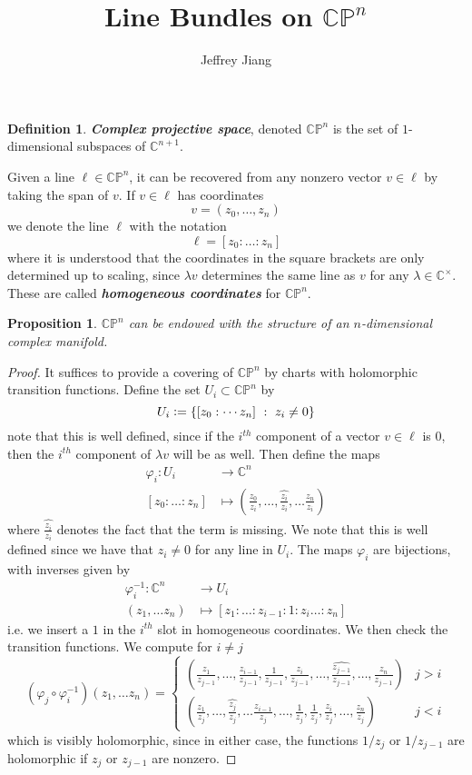 \documentclass[psamsfonts, 12pt]{amsart}
\newtheorem{prop}[thm]{Proposition}
\theoremstyle{definition}
\newtheorem{defn}[thm]{Definition}
\theoremstyle{remark}
\newcommand{\ib}[1]{\textbf{\textit{#1}}}
\newcommand{\C}{\mathbb{C}}
\newcommand{\CP}{\mathbb{CP}}
\newcommand{\inv}{^{-1}}
\newcommand{\set}[1]{\left\lbrace #1 \right\rbrace}
\newcommand{\defeq}{\vcentcolon=}
\begin{document}
%
\author{Jeffrey Jiang}
%
\title{Line Bundles on $\CP^n$}
%
\setcounter{section}{1}
%
\maketitle
%
\begin{defn}
\ib{Complex projective space}, denoted $\CP^n$ is the set of $1$-dimensional
subspaces of $\C^{n+1}$.
\end{defn}
%
Given a line $\ell \in \CP^n$, it can be recovered from any nonzero vector
$v \in \ell$ by taking the span of $v$. If $v \in \ell$ has coordinates
\[
v = (z_0, \ldots, z_n)
\]
we denote the line $\ell$ with the notation
\[
\ell = [z_0 : \ldots : z_n]
\]
where it is understood that the coordinates in the square brackets are only determined
up to scaling, since $\lambda v$ determines the same line as $v$ for any
$\lambda \in \C^\times$. These are called \ib{homogeneous coordinates} for $\CP^n$.
%
\begin{prop}
$\CP^n$ can be endowed with the structure of an $n$-dimensional complex manifold.
\end{prop}
%
\begin{proof}
It suffices to provide a covering of $\CP^n$ by charts with holomorphic
transition functions. Define the set $U_i \subset \CP^n$ by
\[
U_i \defeq \set{[z_0: \cdots z_n] ~:~ z_i \neq 0}
\]
note that this is well defined, since if the $i^{th}$ component of a
vector $v \in \ell$ is $0$, then the $i^{th}$ component of $\lambda v$ will be
as well. Then define the maps
\begin{align*}
\varphi_i : U_i &\to \C^n \\
[z_0: \ldots : z_n] &\mapsto \left( \frac{z_0}{z_i},\ldots,
\widehat{\frac{z_i}{z_i}}, \ldots \frac{z_n}{z_i} \right)
\end{align*}
where $\widehat{\frac{z_i}{z_i}}$ denotes the fact that the term is missing.
We note that this is well defined since we have that $z_i \neq 0$ for any line
in $U_i$. The maps $\varphi_i$ are bijections, with inverses given by
\begin{align*}
\varphi_i\inv : \C^n &\to U_i \\
(z_1,\ldots z_n) &\mapsto [z_1:\ldots: z_{i-1}: 1 : z_i \ldots : z_n]
\end{align*}
i.e. we insert a $1$ in the $i^{th}$ slot in homogeneous coordinates. We then check
the transition functions. We compute for $i \neq j$
\[
(\varphi_j \circ \varphi_i\inv)(z_1,\ldots z_n)
= \begin{cases}
\left(\frac{z_1}{z_{j-1}}, \ldots ,\frac{z_{i-1}}{z_{j-1}}, \frac{1}{z_{j-1}},
\frac{z_i}{z_{j-1}}, \ldots ,\widehat{\frac{z_{j-1}}{z_{j-1}}} ,
\ldots,\frac{z_n}{z_{j-1}}\right) & j > i \\[20pt]
\left(\frac{z_1}{z_j},\ldots,\widehat{\frac{z_j}{z_j}},\ldots\frac{z_{i-1}}{z_j},
\ldots,\frac{1}{z_j},\frac{1}{z_j},\frac{z_i}{z_j},\ldots,\frac{z_n}{z_j} \right)
& j < i
\end{cases}
\]
which is visibly holomorphic, since in either case, the functions $1/z_j$ or $1/z_{j-1}$
are holomorphic if $z_j$ or $z_{j-1}$ are nonzero.
\end{proof}
\end{document}
